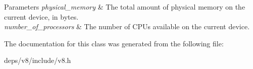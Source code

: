 \begin{DoxyParams}{Parameters}
{\em physical\+\_\+memory} & The total amount of physical memory on the current device, in bytes. \\
\hline
{\em number\+\_\+of\+\_\+processors} & The number of C\+P\+Us available on the current device. \\
\hline
\end{DoxyParams}


The documentation for this class was generated from the following file\+:\begin{DoxyCompactItemize}
\item 
deps/v8/include/v8.\+h\end{DoxyCompactItemize}

